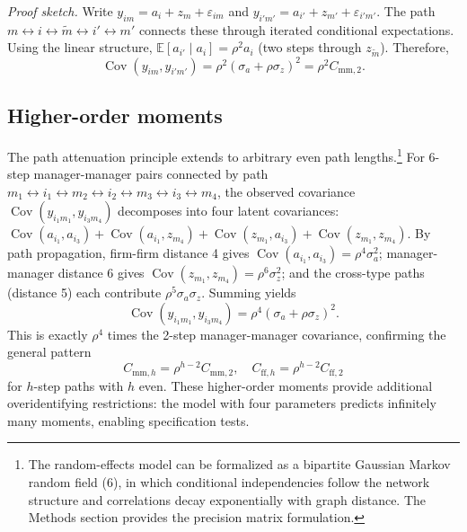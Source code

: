 \documentclass[9pt,twocolumn,twoside]{pnas-new}
\begin{document}
\textit{Proof sketch.} Write $y_{im}=a_i+z_m+\varepsilon_{im}$ and $y_{i'm'}=a_{i'}+z_{m'}+\varepsilon_{i'm'}$. The path $m \leftrightarrow i \leftrightarrow \tilde m \leftrightarrow i' \leftrightarrow m'$ connects these through iterated conditional expectations. Using the linear structure, $\mathbb{E}[a_{i'}\mid a_i] = \rho^2 a_i$ (two steps through $z_{\tilde m}$). Therefore,
\[
 \operatorname{Cov}(y_{im}, y_{i'm'}) = \rho^2(\sigma_a + \rho\sigma_z)^2 = \rho^2 C_{\text{mm},2}.
\]

\subsection*{Higher-order moments}
The path attenuation principle extends to arbitrary even path lengths.\footnote{The random-effects model can be formalized as a bipartite Gaussian Markov random field (6), in which conditional independencies follow the network structure and correlations decay exponentially with graph distance. The Methods section provides the precision matrix formulation.} For 6-step manager-manager pairs connected by path $m_1 \leftrightarrow i_1 \leftrightarrow m_2 \leftrightarrow i_2 \leftrightarrow m_3 \leftrightarrow i_3 \leftrightarrow m_4$, the observed covariance $\operatorname{Cov}(y_{i_1m_1}, y_{i_3m_4})$ decomposes into four latent covariances: $\operatorname{Cov}(a_{i_1}, a_{i_3}) + \operatorname{Cov}(a_{i_1}, z_{m_4}) + \operatorname{Cov}(z_{m_1}, a_{i_3}) + \operatorname{Cov}(z_{m_1}, z_{m_4})$. By path propagation, firm-firm distance 4 gives $\operatorname{Cov}(a_{i_1}, a_{i_3})=\rho^4\sigma_a^2$; manager-manager distance 6 gives $\operatorname{Cov}(z_{m_1}, z_{m_4})=\rho^6\sigma_z^2$; and the cross-type paths (distance 5) each contribute $\rho^5\sigma_a\sigma_z$. Summing yields
\begin{equation}
\label{eq:mm6}
 \operatorname{Cov}(y_{i_1m_1}, y_{i_3m_4}) = \rho^4(\sigma_a + \rho\sigma_z)^2.
\end{equation}
This is exactly $\rho^4$ times the 2-step manager-manager covariance, confirming the general pattern
\begin{equation}
\label{eq:general-pattern}
 C_{\text{mm},h} = \rho^{h-2} C_{\text{mm},2}, \quad C_{\text{ff},h} = \rho^{h-2} C_{\text{ff},2}
\end{equation}
for $h$-step paths with $h$ even. These higher-order moments provide additional overidentifying restrictions: the model with four parameters predicts infinitely many moments, enabling specification tests.
\end{document}
